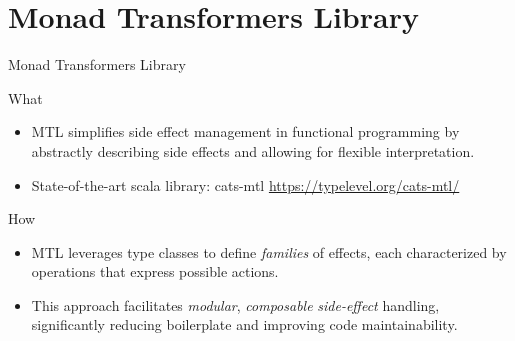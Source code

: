 \documentclass[presentation, 10pt]{beamer}\mode<presentation>{\usetheme{AMSBolognaFC}}
\begin{document}
\section{Monad Transformers Library}
\begin{frame}{Monad Transformers Library}
	\begin{exampleblock}{What}
		\begin{itemize}
			\item MTL simplifies side effect management in functional programming by abstractly describing side effects and allowing for flexible interpretation.
			\item State-of-the-art scala library: cats-mtl \url{https://typelevel.org/cats-mtl/}
		\end{itemize}
	\end{exampleblock}
	\begin{exampleblock}{How}
		\begin{itemize}
			\item MTL leverages type classes to define \emph{families} of effects, each characterized by operations that express possible actions.
		  \item This approach facilitates \emph{modular}, \emph{composable} \emph{side-effect} handling, significantly reducing boilerplate and improving code maintainability.
		\end{itemize}
	\end{exampleblock}	
\end{frame}
\end{document}
